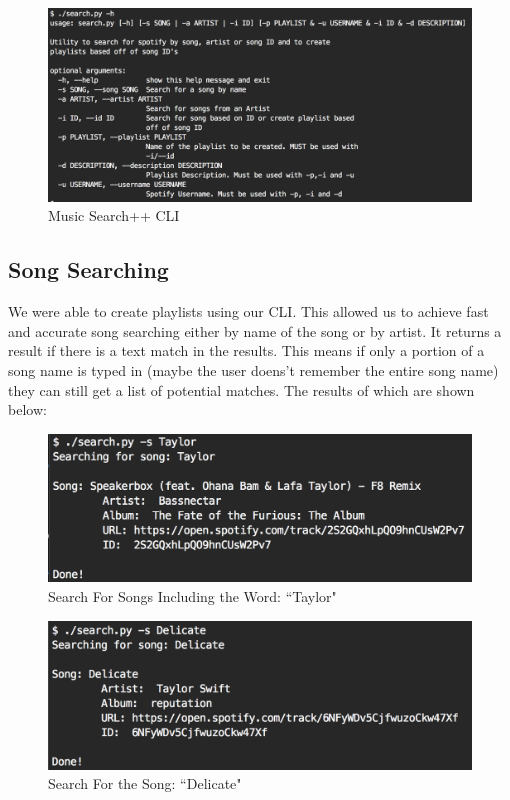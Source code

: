 \documentclass [letter,12pt] {article}
\begin{document}
    \begin{figure}[htp]
        \centering
        \includegraphics[width=\textwidth]{CLI_Help.png}
        \caption{Music Search++ CLI}
        \label{fig:searchcli}
    \end{figure}

    \subsection{Song Searching}
        We were able to create playlists using our CLI. This allowed us to achieve fast and accurate song searching either by name of the song or by artist. It returns a result if there is a text match in the results. This means if only a portion of a song name is typed in (maybe the user doens't remember the entire song name) they can still get a list of potential matches. The results of which are shown below:
        
        \begin{figure}[htp]
            \centering
            \includegraphics[width=\textwidth]{Song_Taylor_Search.png}
            \caption{Search For Songs Including the Word: ``Taylor"}
            \label{fig:taylorsong}
        \end{figure}
    
        \begin{figure}[htp]
            \centering
            \includegraphics[width=\textwidth]{Delicate_Song_Search.png}
            \caption{Search For the Song: ``Delicate"}
            \label{fig:delicatesong}
        \end{figure}
        
\end{document}
